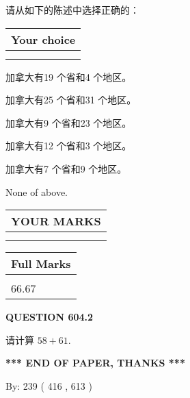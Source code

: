 \documentclass{ctexart}
\begin{document}
  
请从如下的陈述中选择正确的：
  
  
\noindent\hspace{3.0in} \begin{tabular}{|l|}
\hline
Your choice \\
\hline
 \\ 
 \\ 
\hline
\end{tabular}
  
  
 
 
加拿大有19 个省和4 个地区。
 
 
加拿大有25 个省和31 个地区。
 
 
加拿大有9 个省和23 个地区。
 
 
加拿大有12 个省和3 个地区。
 
 
加拿大有7 个省和9 个地区。
 
 
 None of above.
 
 
  
\vspace{0.2in}
  
\noindent\begin{tabular}{|l|}
\hline
 YOUR MARKS  \\
\hline
 \\ 
 \\ 
\hline
\end{tabular}
\hspace{0.05in} \begin{tabular}{|l|}
\hline
 Full Marks  \\
\hline
 \\ 
66.67 \\
\hline
\end{tabular}
{\textbf{\Large{QUESTION
604.2 
}}}
  
  
 
请计算 $ %
58 +  %
61 $.
 

 

 
   
   
 \vspace{0.2in}
 
   
   
   
   
\vspace{1.0in} 
{\textbf{\large{ *** END OF PAPER, THANKS *** }}} 
   
   
\hspace{1.0in} By: 
 239 ( 416 ,  613 )
   
\end{document}
